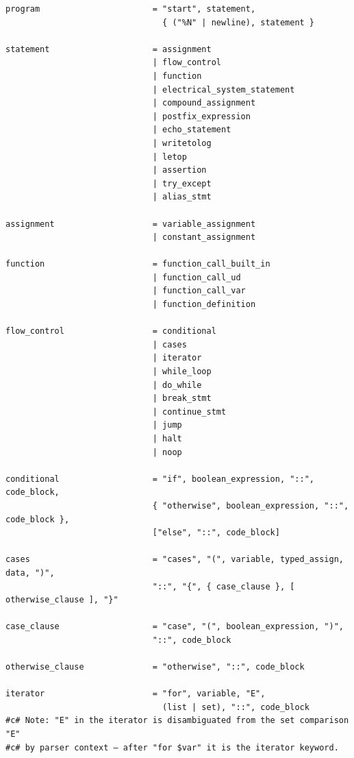 \begin{verbatim}
program                       = "start", statement,
                                { ("%N" | newline), statement }

statement                     = assignment
                              | flow_control
                              | function
                              | electrical_system_statement
                              | compound_assignment
                              | postfix_expression
                              | echo_statement
                              | writetolog
                              | letop
                              | assertion
                              | try_except
                              | alias_stmt

assignment                    = variable_assignment          
                              | constant_assignment

function                      = function_call_built_in
                              | function_call_ud
                              | function_call_var
                              | function_definition

flow_control                  = conditional
                              | cases
                              | iterator
                              | while_loop
                              | do_while
                              | break_stmt
                              | continue_stmt
                              | jump
                              | halt
                              | noop

conditional                   = "if", boolean_expression, "::", code_block,
                              { "otherwise", boolean_expression, "::", code_block },
                              ["else", "::", code_block]

cases                         = "cases", "(", variable, typed_assign, data, ")", 
                              "::", "{", { case_clause }, [ otherwise_clause ], "}"

case_clause                   = "case", "(", boolean_expression, ")", 
                              "::", code_block

otherwise_clause              = "otherwise", "::", code_block

iterator                      = "for", variable, "E",
                                (list | set), "::", code_block
#c# Note: "E" in the iterator is disambiguated from the set comparison "E"
#c# by parser context — after "for $var" it is the iterator keyword.


\end{verbatim}

